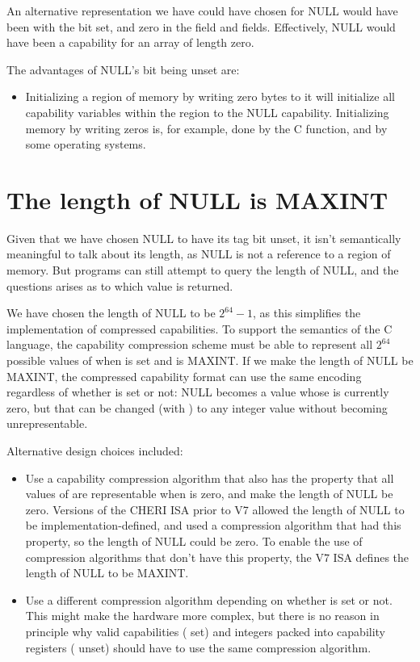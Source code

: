 An alternative representation we have could have chosen for NULL would
have been with the \ctag{} bit set, and zero in the \cbase{} field and
\clength{} fields.  Effectively, NULL would have been a capability for
an array of length zero.

The advantages of NULL's \ctag{} bit being unset are:

\begin{itemize}
\item
Initializing a region of memory by writing zero bytes to it will initialize
all capability variables within the region to the NULL capability. Initializing
memory by writing zeros is, for example, done by the C 
function, and by some operating systems.
\end{itemize}

\section{The length of NULL is MAXINT}

Given that we have chosen NULL to have its tag bit unset, it isn't semantically
meaningful to talk about its length, as NULL is not a reference to a region
of memory. But programs can still attempt to query the length of NULL, and
the questions arises as to which value is returned.

We have chosen the length of NULL to be $2^{64}-1$, as this simplifies the
implementation of compressed capabilities. To support the semantics of the
C language, the capability compression scheme must be able to represent
all $2^{64}$ possible values of \coffset{} when \ctag{} is set and \clength{}
is MAXINT. If we make the length of NULL be MAXINT, the compressed capability
format can use the same encoding regardless of whether \ctag{} is set or
not:  NULL becomes a value whose \coffset{} is currently zero, but that can
be changed (with ) to any integer value without
becoming unrepresentable.

Alternative design choices included:

\begin{itemize}
\item
Use a capability compression algorithm that also has the property that all
values of \coffset{} are representable when \clength{} is zero, and make
the length of NULL be zero. Versions of the CHERI ISA prior to V7 allowed the
length of NULL to be implementation-defined, and used a compression algorithm
that had this property, so the length of NULL could be zero. To enable the
use of compression algorithms that don't have this property, the V7 ISA
defines the length of NULL to be MAXINT.
\item
Use a different compression algorithm depending on whether \ctag{} is set
or not. This might make the hardware more complex, but there is no reason in
principle why valid capabilities (\ctag{} set) and integers packed into
capability registers (\ctag{} unset) should have to use the same compression
algorithm.
\end{itemize}

